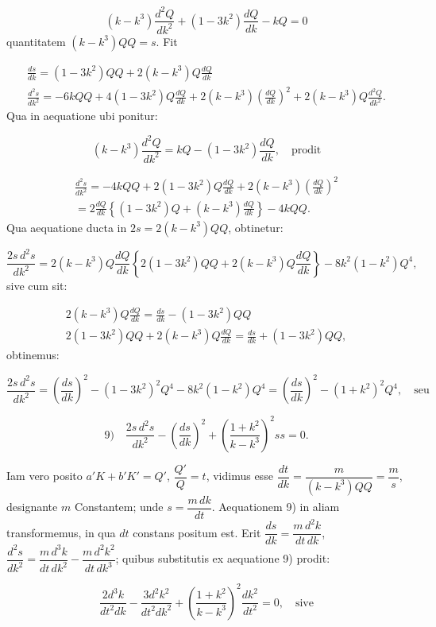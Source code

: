 \documentclass{article}
\begin{document}
\[
(k-k^{3})\frac{d^{2}Q}{dk^{2}}+(1-3k^{2})\frac{dQ}{dk}-kQ=0
\]
quantitatem $(k-k^{3})QQ=s$. Fit

\[
\begin{gathered}
\frac{ds}{dk}=(1-3k^{2})QQ+2(k-k^{3})Q\frac{dQ}{dk}\\[1.5ex]
\frac{d^{2}s}{dk^{2}}=-6kQQ+4(1-3k^{2})Q\frac{dQ}{dk}+2(k-k^{3})\left(\frac{dQ}{dk}\right)^{2}+2(k-k^{3})Q\frac{d^{2}Q}{dk^{2}}.
\end{gathered}
\]
Qua in aequatione ubi ponitur:

\[
(k-k^{3})\frac{d^{2}Q}{dk^{2}}=kQ-(1-3k^{2})\frac{dQ}{dk},\quad\text{prodit}
\]

\[
\begin{gathered}
\frac{d^{2}s}{dk^{2}}=-4kQQ+2(1-3k^{2})Q\frac{dQ}{dk}+2(k-k^{3})\left(\frac{dQ}{dk}\right)^{2}\\[1.5ex]
=2\frac{dQ}{dk}\left\{(1-3k^{2})Q+(k-k^{3})\frac{dQ}{dk}\right\}-4kQQ.
\end{gathered}
\]
Qua aequatione ducta in $2s=2(k-k^{3})QQ$, obtinetur:

\[
\frac{2s\,d^{2}s}{dk^{2}}=2(k-k^{3})Q\frac{dQ}{dk}\left\{2(1-3k^{2})QQ+2(k-k^{3})Q\frac{dQ}{dk}\right\}-8k^{2}(1-k^{2})Q^{4},
\]
sive cum sit:

\[
\begin{gathered}
2(k-k^{3})Q\frac{dQ}{dk}=\frac{ds}{dk}-(1-3k^{2})QQ\\[1.5ex]
2(1-3k^{2})QQ+2(k-k^{3})Q\frac{dQ}{dk}=\frac{ds}{dk}+(1-3k^{2})QQ,
\end{gathered}
\]
obtinemus:

\[
\frac{2s\,d^{2}s}{dk^{2}}=\left(\frac{ds}{dk}\right)^{2}-(1-3k^{2})^{2}Q^{4}-8k^{2}(1-k^{2})Q^{4}=\left(\frac{ds}{dk}\right)^{2}-(1+k^{2})^{2}Q^{4},\quad\text{seu}
\]

\[
\text{9)}\quad\frac{2s\,d^{2}s}{dk^{2}}-\left(\frac{ds}{dk}\right)^{2}+\left(\frac{1+k^{2}}{k-k^{3}}\right)^{2}ss=0.
\]

Iam vero posito $a'K+b'K'=Q'$, $\dfrac{Q'}{Q}=t$, vidimus esse $\dfrac{dt}{dk}=\dfrac{m}{(k-k^{3})QQ}=\dfrac{m}{s}$, designante $m$ Constantem; unde $s=\dfrac{m\,dk}{dt}$. Aequationem 9) in aliam transformemus, in qua $dt$ constans positum est. Erit $\dfrac{ds}{dk}=\dfrac{m\,d^{2}k}{dt\,dk}$, $\dfrac{d^{2}s}{dk^{2}}=\dfrac{m\,d^{3}k}{dt\,dk^{2}}-\dfrac{m\,d^{2}k^{2}}{dt\,dk^{3}}$; quibus substitutis ex aequatione 9) prodit:

\[
\frac{2d^{3}k}{dt^{2}dk}-\frac{3d^{2}k^{2}}{dt^{2}dk^{2}}+\left(\frac{1+k^{2}}{k-k^{3}}\right)^{2}\frac{dk^{2}}{dt^{2}}=0,\quad\text{sive}
\]
\end{document}
